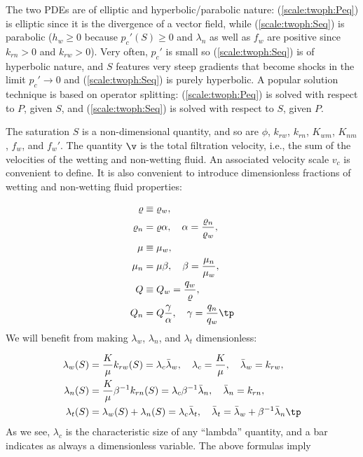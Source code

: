 \documentclass[graybox,envcountchap,sectrefs,final]{svmonodo}
\begin{document}
The two PDEs are of elliptic and hyperbolic/parabolic nature:
(\ref{scale:twoph:Peq}) is elliptic since it is the divergence of a
vector field, while (\ref{scale:twoph:Seq}) is parabolic ($h_w\geq 0$
because $p_c'(S)\geq 0$ and $\lambda_n$ as well as $f_w$ are positive
since $k_{rn}>0$ and $k_{rw}>0$). Very often, $p_c'$ is small so
(\ref{scale:twoph:Seq}) is of hyperbolic nature, and $S$ features very
steep gradients that become shocks in the limit $p_c'\rightarrow 0$
and (\ref{scale:twoph:Seq}) is purely hyperbolic.
A popular solution technique is based on operator splitting:
(\ref{scale:twoph:Peq}) is solved with respect to $P$, given $S$, and
(\ref{scale:twoph:Seq}) is solved with respect to $S$, given $P$.

The saturation $S$ is a non-dimensional quantity, and so are $\phi$,
$k_{rw}$, $k_{rn}$, $K_{wm}$, $K_{nm}$, $f_w$, and $f_w'$.
The quantity $\v$ is the total filtration velocity, i.e., the
sum of the velocities of the wetting and non-wetting fluid.
An associated velocity scale $v_c$ is convenient to define.
It is also convenient to introduce dimensionless fractions of
wetting and non-wetting fluid properties:

\begin{align*}
\varrho &\equiv \varrho_w,\\ 
\varrho_n &= \varrho\alpha,\quad \alpha = \frac{\varrho_n}{\varrho_w},\\ 
\mu &\equiv\mu_w,\\ 
\mu_n &= \mu\beta,\quad \beta = \frac{\mu_n}{\mu_w},\\ 
Q &\equiv Q_w = \frac{q_w}{\varrho},\\ 
Q_n &= Q\frac{\gamma}{\alpha},\quad \gamma = \frac{q_n}{q_w}\tp
\end{align*}
We will benefit from making $\lambda_w$, $\lambda_n$, and $\lambda_t$
dimensionless:

\begin{align*}
\lambda_w(S) &= \frac{K}{\mu}k_{rw}(S) = \lambda_c\bar\lambda_w,\quad
\lambda_c=\frac{K}{\mu},\quad \bar\lambda_w = k_{rw},\\ 
\lambda_n(S) &= \frac{K}{\mu}\beta^{-1}k_{rn}(S) = \lambda_c\beta^{-1}\bar\lambda_n,
\quad\bar\lambda_n = k_{rn},\\ 
\lambda_t(S) &= \lambda_w(S) + \lambda_n(S) = \lambda_c\bar\lambda_t,\quad
\bar\lambda_t = \bar \lambda_w +
\beta^{-1}\bar\lambda_n\tp
\end{align*}
As we see, $\lambda_c$ is the characteristic size of any ``lambda''
quantity, and a bar indicates as always a dimensionless variable.
The above formulas imply
\end{document}
